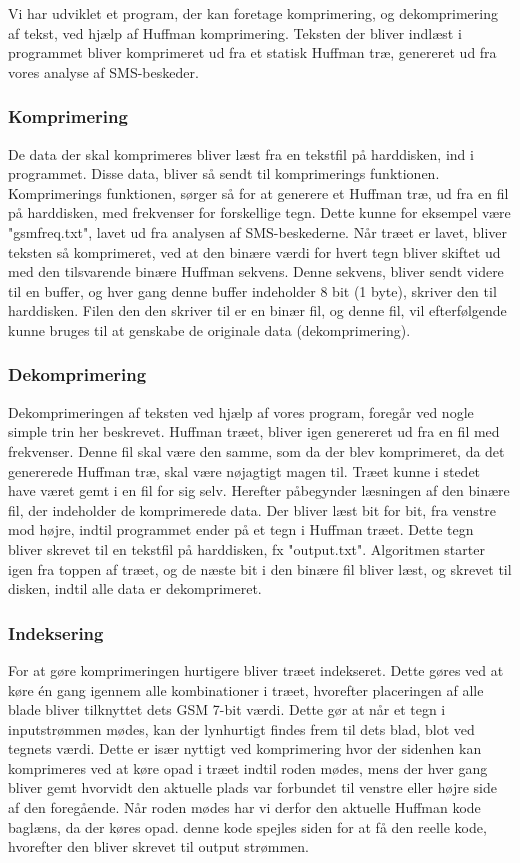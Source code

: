 Vi har udviklet et program, der kan foretage komprimering, og dekomprimering af tekst, ved hjælp af Huffman komprimering. Teksten der bliver indlæst i programmet bliver komprimeret ud fra et statisk Huffman træ, genereret ud fra vores analyse af SMS-beskeder.


\subsubsection{Komprimering}

De data der skal komprimeres bliver læst fra en tekstfil på harddisken, ind i programmet. Disse data, bliver så sendt til komprimerings funktionen. Komprimerings funktionen, sørger så for at generere et Huffman træ, ud fra en fil på harddisken, med frekvenser for forskellige tegn. Dette kunne for eksempel være "gsmfreq.txt", lavet ud fra analysen af SMS-beskederne.
Når træet er lavet, bliver teksten så komprimeret, ved at den binære værdi for hvert tegn bliver skiftet ud med den tilsvarende binære Huffman sekvens. Denne sekvens, bliver sendt videre til en buffer, og hver gang denne buffer indeholder 8 bit (1 byte), skriver den til harddisken. Filen den den skriver til er en binær fil, og denne fil, vil efterfølgende kunne bruges til at genskabe de originale data (dekomprimering).

\subsubsection{Dekomprimering}

Dekomprimeringen af teksten ved hjælp af vores program, foregår ved nogle simple trin her beskrevet. Huffman træet, bliver igen genereret ud fra en fil med frekvenser. Denne fil skal være den samme, som da der blev komprimeret, da det genererede Huffman træ, skal være nøjagtigt magen til. Træet kunne i stedet have været gemt i en fil for sig selv.
Herefter påbegynder læsningen af den binære fil, der indeholder de komprimerede data. Der bliver læst bit for bit, fra venstre mod højre, indtil programmet ender på et tegn i Huffman træet. Dette tegn bliver skrevet til en tekstfil på harddisken, fx "output.txt". Algoritmen starter igen fra toppen af træet, og de næste bit i den binære fil bliver læst, og skrevet til disken, indtil alle data er dekomprimeret.

\subsubsection{Indeksering}
For at gøre komprimeringen hurtigere bliver træet indekseret. Dette gøres ved at køre én gang igennem alle kombinationer i træet, hvorefter placeringen af alle blade bliver tilknyttet dets GSM 7-bit værdi. Dette gør at når et tegn i inputstrømmen mødes, kan der lynhurtigt findes frem til dets blad, blot ved tegnets værdi. Dette er især nyttigt ved komprimering hvor der sidenhen kan komprimeres ved at køre opad i træet indtil roden mødes, mens der hver gang bliver gemt hvorvidt den aktuelle plads var forbundet til venstre eller højre side af den foregående. Når roden mødes har vi derfor den aktuelle Huffman kode baglæns, da der køres opad. denne kode spejles siden for at få den reelle kode, hvorefter den bliver skrevet til output strømmen.